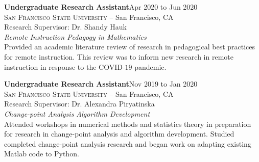 \documentclass[hidelinks, 10.5pt]{article}
\def\contentwidth{0.9\linewidth}    %
\def\contentblockspacing{2.5mm}     %
\def\contentheaderspacing{1mm}      %
\begin{document}
{%

\begin{minipage}[ct]{\contentwidth}
    \textbf{Undergraduate Research Assistant}\hfill Apr 2020 to Jun 2020\\
    \textsc{San Francisco State University} -- San Francisco, CA\\
    Research Supervisor: Dr. Shandy Hauk
    \vspace{\contentheaderspacing}\\
    {\textit{Remote Instruction Pedagogy in Mathematics}}\\
    Provided an academic literature review of research in pedagogical best practices for remote instruction.  This review was to inform
    new research in remote instruction in response to the COVID-$19$ pandemic.
\end{minipage}

\vspace{\contentblockspacing}


\begin{minipage}[ct]{\contentwidth}
    \textbf{Undergraduate Research Assistant}\hfill Nov 2019 to Jan 2020\\
    \textsc{San Francisco State University} -- San Francisco, CA\\
    Research Supervisor: Dr. Alexandra Piryatinska
    \vspace{\contentheaderspacing}\\
    {\textit{Change-point Analysis Algorithm Development}}\\
    Attended workshops in numerical methods and statistics theory in preparation for research in change-point analysis and algorithm
    development.  Studied completed change-point analysis research and began work on adapting existing Matlab code to Python.
\end{minipage}

}
\end{document}
